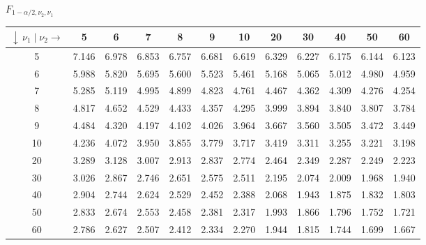 $F_{1-\alpha/2,\nu_2, \nu_1}$

\vspace{1mm}
\begin{footnotesize}
\begin{tabular}{|c||c|c|c|c|c|c|c|c|c|c|c|}
\hline
 $\downarrow \, \nu_1 \; | \; \nu_2 \rightarrow$  & 5 & 6 & 7 & 8 & 9 & 10 & 20 & 30 & 40 & 50 & 60 \\
\hline\hline
 5 & 7.146 & 6.978 & 6.853 & 6.757 & 6.681 & 6.619 & 6.329 & 6.227 & 6.175 & 6.144 & 6.123 \\
\hline
 6 & 5.988 & 5.820 & 5.695 & 5.600 & 5.523 & 5.461 & 5.168 & 5.065 & 5.012 & 4.980 & 4.959 \\
\hline
 7 & 5.285 & 5.119 & 4.995 & 4.899 & 4.823 & 4.761 & 4.467 & 4.362 & 4.309 & 4.276 & 4.254 \\
\hline
 8 & 4.817 & 4.652 & 4.529 & 4.433 & 4.357 & 4.295 & 3.999 & 3.894 & 3.840 & 3.807 & 3.784 \\
\hline
 9 & 4.484 & 4.320 & 4.197 & 4.102 & 4.026 & 3.964 & 3.667 & 3.560 & 3.505 & 3.472 & 3.449 \\
\hline
 10 & 4.236 & 4.072 & 3.950 & 3.855 & 3.779 & 3.717 & 3.419 & 3.311 & 3.255 & 3.221 & 3.198 \\
\hline
 20 & 3.289 & 3.128 & 3.007 & 2.913 & 2.837 & 2.774 & 2.464 & 2.349 & 2.287 & 2.249 & 2.223 \\
\hline
 30 & 3.026 & 2.867 & 2.746 & 2.651 & 2.575 & 2.511 & 2.195 & 2.074 & 2.009 & 1.968 & 1.940 \\
\hline
 40 & 2.904 & 2.744 & 2.624 & 2.529 & 2.452 & 2.388 & 2.068 & 1.943 & 1.875 & 1.832 & 1.803 \\
\hline
 50 & 2.833 & 2.674 & 2.553 & 2.458 & 2.381 & 2.317 & 1.993 & 1.866 & 1.796 & 1.752 & 1.721 \\
\hline
 60 & 2.786 & 2.627 & 2.507 & 2.412 & 2.334 & 2.270 & 1.944 & 1.815 & 1.744 & 1.699 & 1.667 \\
\hline
\end{tabular}
\end{footnotesize}
